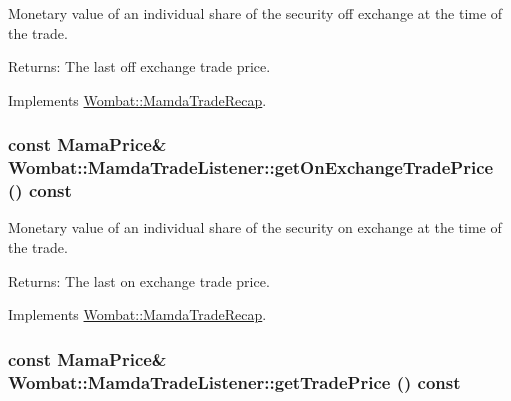 Monetary value of an individual share of the security off exchange at the time of the trade. 

\begin{Desc}
\item[Returns:]The last off exchange trade price. \end{Desc}


Implements \hyperlink{classWombat_1_1MamdaTradeRecap_4441eab85326326aa600c783a33a55bd}{Wombat::Mamda\-Trade\-Recap}.\hypertarget{classWombat_1_1MamdaTradeListener_aa798b030e645e17bda3911d1b5a9bf9}{
\subsubsection[getOnExchangeTradePrice]{\setlength{\rightskip}{0pt plus 5cm}const Mama\-Price\& Wombat::Mamda\-Trade\-Listener::get\-On\-Exchange\-Trade\-Price () const}}
\label{classWombat_1_1MamdaTradeListener_aa798b030e645e17bda3911d1b5a9bf9}


Monetary value of an individual share of the security on exchange at the time of the trade. 

\begin{Desc}
\item[Returns:]The last on exchange trade price. \end{Desc}


Implements \hyperlink{classWombat_1_1MamdaTradeRecap_9979bc1d67b53dca01261a34a06d0834}{Wombat::Mamda\-Trade\-Recap}.\hypertarget{classWombat_1_1MamdaTradeListener_f2f5cd501bc1fcb6717a81c001004228}{
\subsubsection[getTradePrice]{\setlength{\rightskip}{0pt plus 5cm}const Mama\-Price\& Wombat::Mamda\-Trade\-Listener::get\-Trade\-Price () const}}
\label{classWombat_1_1MamdaTradeListener_f2f5cd501bc1fcb6717a81c001004228}


